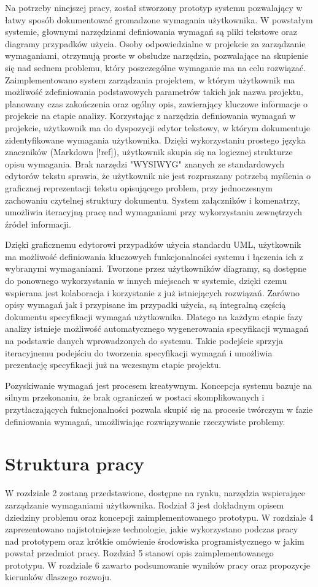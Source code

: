       Na potrzeby ninejszej pracy, został stworzony prototyp systemu pozwalający w łatwy sposób dokumentować gromadzone wymagania użytkownika. W powstałym systemie, głownymi narzędziami definiowania wymagań są pliki tekstowe oraz diagramy przypadków użycia. Osoby odpowiedzialne w projekcie za zarządzanie wymaganiami, otrzymują proste w obsłudze narzędzia, pozwalające na skupienie się nad sednem problemu, który poszczególne wymaganie ma na celu rozwiązać. Zaimplementowano system zarządzania projektem, w którym użytkownik ma możliwość zdefiniowania podstawowych parametrów takich jak nazwa projektu, planowany czas zakończenia oraz ogólny opis, zawierający kluczowe informacje o projekcie na etapie analizy. Korzystając z narzędzia definiowania wymagań w projekcie, użytkownik ma do dyspozycji edytor tekstowy, w którym dokumentuje zidentyfikowane wymagania użytkownika. Dzięki wykorzystaniu prostego języka znaczników (Markdown [!ref]), użytkownik skupia się na logicznej strukturze opisu wymagania. Brak narzędzi "WYSIWYG" znanych ze standardowych edytorów tekstu sprawia, że użytkownik nie jest rozpraszany potrzebą myślenia o graficznej reprezentacji tekstu opisującego problem, przy jednoczesnym zachowaniu czytelnej struktury dokumentu. System załączników i komenatrzy, umożliwia iteracyjną pracę nad wymaganiami przy wykorzystaniu zewnętrzych źródeł informacji. 

      Dzięki graficznemu edytorowi przypadków użycia standardu UML, użytkownik ma możliwość definiowania kluczowych funkcjonalności systemu i łączenia ich z wybranymi wymaganiami. Tworzone przez użytkowników diagramy, są dostępne do ponownego wykorzystania w innych miejscach w systemie, dzięki czemu wspierana jest kolaboracja i korzystanie z już istniejących rozwiązań. Zarówno opisy wymagań jak i przypisane im przypadki użycia, są integralną częścią dokumentu specyfikacji wymagań użytkownika. Dlatego na każdym etapie fazy analizy istnieje możliwość automatycznego wygenerowania specyfikacji wymagań na podstawie danych wprowadzonych do systemu. Takie podejście sprzyja iteracyjnemu podejściu do tworzenia specyfikacji wymagań i umożliwia prezentację specyfikacji już na wczesnym etapie projektu. 

      Pozyskiwanie wymagań jest procesem kreatywnym. Koncepcja systemu bazuje na silnym przekonaniu, że brak ograniczeń w postaci skomplikowanych i przytłaczających fukncjonalności pozwala skupić się na procesie twórczym w fazie definiowania wymagań, umożliwiając rozwiązywanie rzeczywiste problemy. 

    \section{Struktura pracy}

      W rozdziale 2 zostaną przedstawione, dostępne na rynku, narzędzia wspierające zarządzanie wymaganiami użytkownika. Rodział 3 jest dokładnym opisem dziedziny problemu oraz koncepcji zaimplementowanego prototypu. W rozdziale 4 zaprezentowano najistotniejsze technologie, jakie wykorzystano podczas pracy nad prototypem oraz krótkie omówienie środowiska programistycznego w jakim powstał przedmiot pracy. Rozdział 5 stanowi opis zaimplementowanego prototypu. W rozdziale 6 zawarto podsumowanie wyników pracy oraz propozycje kierunków dlaszego rozwoju. 
